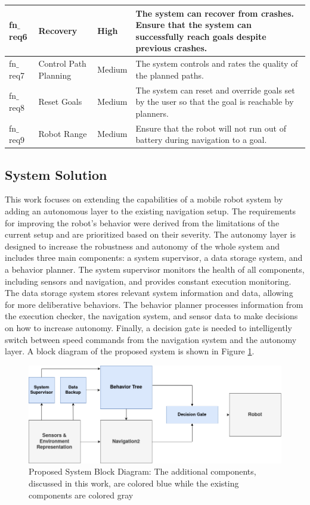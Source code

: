 \documentclass[letterpaper, 10pt, conference]{ieeeconf}
\begin{document}
\begin{table}[ht]
\begin{tabular}{|m{}|m{}|m{}|m{}|}
			\hline
			fn$\_$req6 & Recovery & High & The system can recover from crashes. Ensure that the system can successfully reach goals despite previous crashes.\\ 
			\hline 
			fn$\_$req7 & Control Path Planning & Medium & The system controls and rates the quality of the planned paths. \\
			\hline	
			fn$\_$req8 & Reset Goals & Medium & The system can reset and override goals set by the user so that the goal is reachable by planners. \\
			\hline
			fn$\_$req9 & Robot Range & Medium & Ensure that the robot will not run out of battery during navigation to a goal. \\	
			\hline
		\end{tabular}
\end{table}

\subsection{System Solution}

This work focuses on extending the capabilities of a mobile robot system by adding an autonomous layer to the existing navigation setup. The requirements for improving the robot's behavior were derived from the limitations of the current setup and are prioritized based on their severity. The autonomy layer is designed to increase the robustness and autonomy of the whole system and includes three main components: a system supervisor, a data storage system, and a behavior planner. The system supervisor monitors the health of all components, including sensors and navigation, and provides constant execution monitoring. The data storage system stores relevant system information and data, allowing for more deliberative behaviors. The behavior planner processes information from the execution checker, the navigation system, and sensor data to make decisions on how to increase autonomy. Finally, a decision gate is needed to intelligently switch between speed commands from the navigation system and the autonomy layer. A block diagram of the proposed system is shown in Figure \ref{fig:block_diagram}.

\begin{figure}[ht]
	\centering 
	\includegraphics[width=0.9\linewidth]{Figures/block_diagram.png}
	\caption{Proposed System Block Diagram: The additional components, discussed in this work, are colored blue while the existing components are colored gray}
	\label{fig:block_diagram}
\end{figure}
\end{document}
